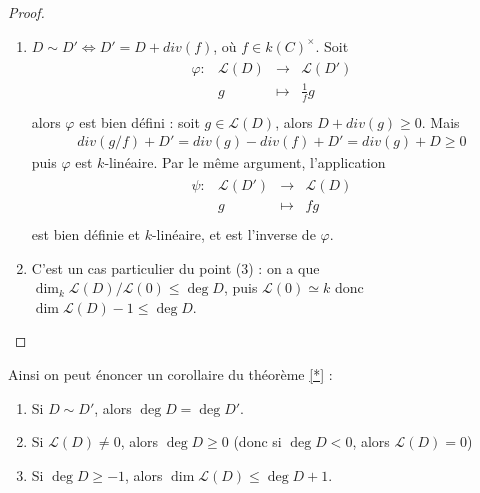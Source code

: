 \begin{proof}
\begin{enumerate}
                \item $D \sim D' \iff D' = D + div(f)$, où $f \in k(C)^\times$. Soit 
                \begin{align*}
                    \begin{array}{cccc}
                        \varphi : & \mathcal{L}(D) & \to & \mathcal{L}(D') \\
                        & g & \mapsto & \frac 1fg \\
                    \end{array}
                \end{align*}
                alors $\varphi$ est bien défini : soit $g \in \mathcal{L}(D)$, alors $D + div(g) \geq 0$. Mais 
                \begin{align*}
                    div(g/f) + D' = div(g) - div(f) + D' = div(g) + D \geq 0
                \end{align*}
                puis $\varphi$ est $k$-linéaire. Par le même argument, l'application 
                \begin{align*}
                    \begin{array}{cccc}
                        \psi : & \mathcal{L}(D') & \to & \mathcal{L}(D) \\
                        & g & \mapsto & fg \\
                    \end{array}
                \end{align*}
                est bien définie et $k$-linéaire, et est l'inverse de $\varphi$.
                \item C'est un cas particulier du point (3) : on a que $\dim_k \mathcal{L}(D)/\mathcal{L}(0) \leq \deg D$, puis $\mathcal{L}(0) \simeq k$ donc $\dim \mathcal{L}(D) - 1 \leq \deg D$.
            \end{enumerate}
        \end{proof}
        Ainsi on peut énoncer un corollaire du théorème \ref{*} :
        \begin{coro}
            \begin{enumerate}
                \item Si $D \sim D'$, alors $\deg D = \deg D'$.
                \item Si $\mathcal{L}(D) \neq 0$, alors $\deg D \geq 0$ (donc si $\deg D < 0$, alors $\mathcal{L}(D) = 0$)
                \item Si $\deg D \geq -1$, alors $\dim \mathcal{L}(D) \leq \deg D + 1$.
            \end{enumerate}
        \end{coro}

